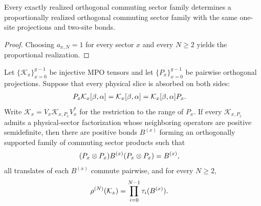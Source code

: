 \begin{definition}
    \label{def:mpdo_orthogonal_commuting_sector_family_to_proportional}
    \leanok
    Every exactly realized orthogonal commuting sector family determines a
    proportionally realized orthogonal commuting sector family with the same
    one-site projections and two-site bonds.
\end{definition}

\begin{proof}\leanok
    Choosing $a_{x,N}=1$ for every sector $x$ and every $N\geq2$ yields the
    proportional realization.
\end{proof}

\begin{lemma}
    \label{thm:mpdo_restricted_positive_factorizations_commuting_family}
    \leanok
    Let $\{\mathcal K_x\}_{x=0}^{g-1}$ be injective MPO tensors and let
    $\{P_x\}_{x=0}^{g-1}$ be pairwise orthogonal projections. Suppose that
    every physical slice is absorbed on both sides:
    \begin{align}
        P_x\mathcal K_x[\beta,\alpha]
         & =\mathcal K_x[\beta,\alpha]
        =\mathcal K_x[\beta,\alpha]P_x.
        \notag
    \end{align}
    Write $\mathcal K_x=V_x\mathcal K_{x,P_x}V_x^*$ for the restriction to
    the range of $P_x$. If every $\mathcal K_{x,P_x}$ admits a physical-sector
    factorization whose neighboring operators are positive semidefinite, then
    there are positive bonds $B^{(x)}$ forming an orthogonally supported
    family of commuting sector products such that
    \begin{align}
        (P_x\otimes P_x)B^{(x)}(P_x\otimes P_x)
         & =B^{(x)},
        \notag
    \end{align}
    all translates of each $B^{(x)}$ commute pairwise, and for every
    $N\geq2$,
    \begin{align}
        \rho^{(N)}(\mathcal K_x)
         & =\prod_{i=0}^{N-1}\tau_i(B^{(x)}).
        \notag
    \end{align}
\end{lemma}

